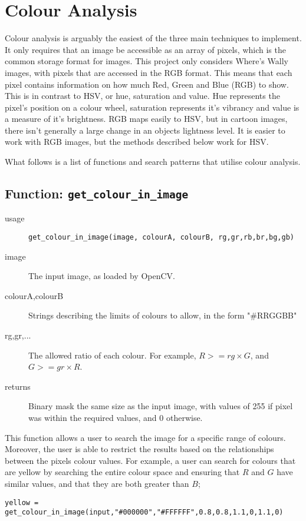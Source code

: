 \documentclass[../main.tex]{subfiles}
\begin{document}
  \section{Colour Analysis}
    Colour analysis is arguably the easiest of the three main techniques to implement.
    It only requires that an image be accessible as an array of pixels, which is the common storage format for images.
    This project only considers Where's Wally images, with pixels that are accessed in the RGB format.
    This means that each pixel contains information on how much Red, Green and Blue (RGB) to show.
    This is in contrast to HSV, or hue, saturation and value.
    Hue represents the pixel's position on a colour wheel, saturation represents it's vibrancy and value is a measure of it's brightness.
    RGB maps easily to HSV, but in cartoon images, there isn't generally a large change in an objects lightness level.
    It is easier to work with RGB images, but the methods described below work for HSV.

    What follows is a list of functions and search patterns that utilise colour analysis.

  \subsection{Function: \texttt{get\_colour\_in\_image}}
    \label{function_getcolinimg}
    \begin{description}
      \item[usage] \texttt{get\_colour\_in\_image(image, colourA, colourB, rg,gr,rb,br,bg,gb)}
      \item[image] The input image, as loaded by OpenCV.
      \item[colourA,colourB] Strings describing the limits of colours to allow, in the form "\#RRGGBB"
      \item[rg,gr,...] The allowed ratio of each colour. For example, $R >= rg\times G$, and $G >=gr\times R$.
      \item[returns] Binary mask the same size as the input image, with values of 255 if pixel was within the required values, and 0 otherwise.
    \end{description}

    This function allows a user to search the image for a specific range of colours.
    Moreover, the user is able to restrict the results based on the relationships between the pixels colour values.
    For example, a user can search for colours that are yellow by searching the entire colour space and ensuring that $R$ and $G$ have similar values, and that they are both greater than $B$;
    \begin{center}
      \texttt{yellow = get\_colour\_in\_image(input,"\#000000","\#FFFFFF",0.8,0.8,1.1,0,1.1,0)}
    \end{center}
\end{document}
